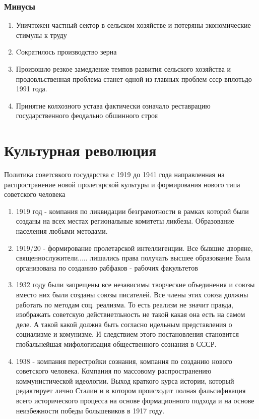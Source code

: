 \documentclass[a4paper]{article}
\begin{document}
\subsubsection{Минусы}
\begin{enumerate}
    \item Уничтожен частный сектор в сельском хозяйстве и потеряны экономические стимулы к труду
    \item Cократилось производство зерна
    \item Произошло резкое замедление темпов развития сельского хозяйства и продовльственная проблема станет одной из главных проблем ссср вплотьдо 1991 года.
    \item Принятие колхозного устава фактически означало реставрацию государственного феодально обшинного строя
\end{enumerate}



\section{Культурная революция}
Политика советсвкого государства с 1919 до 1941 года направленная на распространение новой пролетарской культуры и формирования нового типа советского человека

\begin{enumerate}
    \item 1919 год - компания по ликвидации безграмотности в рамках которой были созданы на всех местах региональные комитеты ликбезы. Образование населения любыми методами.
    \item 1919/20 - формирование пролетарской интеллигенции. Все бывшие дворяне, священнослужители..... лишались права получать высшее образование
    Была организована по созданию рабфаков - рабочих факультетов
    \item 1932 году были запрещены все независимы творческие объединения и союзы
    вместо них были созданы союзы писателей. Все члены этих союза должны работать по методам соц. реализма. То есть реализм не значит правда, изображать советскую действиетльность не такой какая она есть на самом деле. А такой какой должна быть согласно идельным представления о социализме и комунизме. И следствием этого постановления становится глобальнейшая мифологизация общественного сознания в СССР.
    \item 1938 - компания перестройки сознания, компания по созданию нового советского человека. Компания по массовому распространению коммунистической идеологии. Выход краткого курса истории, который редактирует лично Сталин и в котором происходит полная фальсификация всего исторического процесса на основе формационного подхода и на основе неизбежности победы большевиков в 1917 году.
\end{enumerate}
\end{document}
